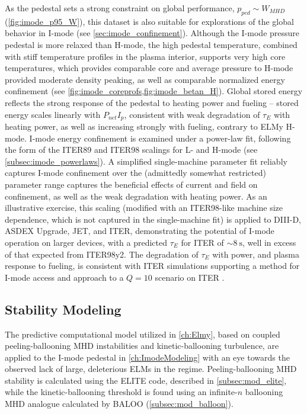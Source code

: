As the pedestal sets a strong constraint on global performance, $p_{ped} \sim W_{MHD}$ (\cref{fig:imode_p95_W}), this dataset is also suitable for explorations of the global behavior in I-mode (see \cref{sec:imode_confinement}).  Although the I-mode pressure pedestal is more relaxed than H-mode, the high pedestal temperature, combined with stiff temperature profiles in the plasma interior, supports very high core temperatures, which provides comparable core and average pressure to H-mode provided moderate density peaking, as well as comparable normalized energy confinement (see \cref{fig:imode_coreprofs,fig:imode_betan_H}).  Global stored energy reflects the strong response of the pedestal to heating power and fueling -- stored energy scales linearly with $P_{net} I_p$, consistent with weak degradation of $\tau_E$ with heating power, as well as increasing strongly with fueling, contrary to ELMy H-mode.  I-mode energy confinement is examined under a power-law fit, following the form of the ITER89 and ITER98 scalings for L- and H-mode (see \cref{subsec:imode_powerlaws}).  A simplified single-machine parameter fit reliably captures I-mode confinement over the (admittedly somewhat restricted) parameter range captures the beneficial effects of current and field on confinement, as well as the weak degradation with heating power.  As an illustrative exercise, this scaling (modified with an ITER98-like machine size dependence, which is not captured in the single-machine fit) is applied to DIII-D, ASDEX Upgrade, JET, and ITER, demonstrating the potential of I-mode operation on larger devices, with a predicted $\tau_E$ for ITER of $\sim \SI{8}{\second}$, well in excess of that expected from ITER98y2.  The degradation of $\tau_E$ with power, and plasma response to fueling, is consistent with ITER simulations supporting a method for I-mode access and approach to a $Q=10$ scenario on ITER \cite{Whyte2011}.

\subsection{Stability Modeling}\label{subsec:conc_imode_mod}

The predictive computational model utilized in \cref{ch:Elmy}, based on coupled peeling-ballooning MHD instabilities and kinetic-ballooning turbulence, are applied to the I-mode pedestal in \cref{ch:ImodeModeling} with an eye towards the observed lack of large, deleterious ELMs in the regime.  Peeling-ballooning MHD stability is calculated using the ELITE code, described in \cref{subsec:mod_elite}, while the kinetic-ballooning threshold is found using an infinite-$n$ ballooning MHD analogue calculated by BALOO (\cref{subsec:mod_balloon}).

